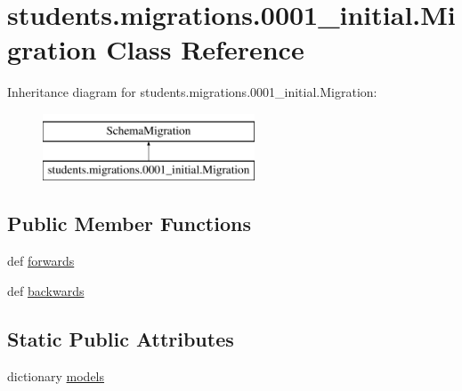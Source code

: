 \hypertarget{classstudents_1_1migrations_1_10001__initial_1_1_migration}{\section{students.\-migrations.0001\-\_\-initial.Migration Class Reference}
\label{classstudents_1_1migrations_1_10001__initial_1_1_migration}
}
Inheritance diagram for students.\-migrations.0001\-\_\-initial.Migration\-:\begin{figure}[H]
\begin{center}
\leavevmode
\includegraphics[height=2.000000cm]{classstudents_1_1migrations_1_10001__initial_1_1_migration}
\end{center}
\end{figure}
\subsection*{Public Member Functions}
\begin{DoxyCompactItemize}
\item 
def \hyperlink{classstudents_1_1migrations_1_10001__initial_1_1_migration_a87a94afad1b7e38c614de2d8c945ffb6}{forwards}
\item 
def \hyperlink{classstudents_1_1migrations_1_10001__initial_1_1_migration_a0bef6d594d4301d31809f74f12b4b765}{backwards}
\end{DoxyCompactItemize}
\subsection*{Static Public Attributes}
\begin{DoxyCompactItemize}
\item 
dictionary \hyperlink{classstudents_1_1migrations_1_10001__initial_1_1_migration_a6bf5c96d511e88a3ab94d17c1e40434f}{models}
\end{DoxyCompactItemize}


